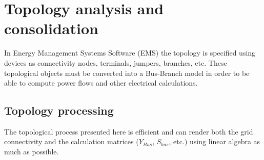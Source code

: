 \documentclass[nols,a4paper,twoside,notoc,fleqn]{tufte-book}
\begin{document}
%






\chapter{Topology analysis and consolidation} \label{topology}

In Energy Management Systems Software (EMS) the topology is specified using devices as connectivity nodes, terminals, jumpers, branches, etc. These topological objects must be converted into a Bus-Branch model in order to be able to compute power flows and other electrical calculations.


\section{Topology processing}
\label{TopologyProcessing}
 The topological process presented here is efficient and can render both the grid connectivity and the calculation matrices ($Y_{Bus}$, $S_{bus}$, etc.) using linear algebra as much as possible.
\end{document}
